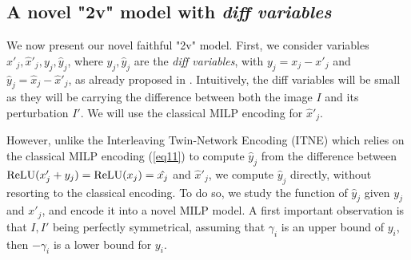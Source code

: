 	

 


	\subsection{A novel "2v" model with {\em diff variables}}

	We now present our novel faithful "2v" model.
    First, we consider variables $x'_j,\hat{x}'_j, y_j, \hat{y}_j$, where $y_j, \hat{y}_j$ are the {\em diff variables}, with     $y_j = x_j - x'_j$ and $\hat{y}_j= \hat{x}_j - \hat{x}'_j$, as already proposed in \cite{ITNE}. 	Intuitively, the diff variables will be small as they will be carrying the difference between both the image $I$ and its perturbation $I'$.
    We will use the classical MILP encoding for $\hat{x}'_j$.

    However, unlike the Interleaving Twin-Network Encoding (ITNE) \cite{ITNE} which relies on the classical MILP encoding (\ref{eq11}) \cite{MILP} to compute $\hat{y}_j$ from the difference between 
	$\mathrm{ReLU}(x'_j + y_j) = \mathrm{ReLU}(x_j) = \hat{x_j}$
	and $\hat{x}'_j$, we compute $\hat{y}_j$ directly, without resorting to the classical encoding. To do so, we study the function of 
    $\hat{y}_j$ given $y_j$ and $x'_j$, and encode it into a novel MILP model.
    A first important observation is that $I,I'$ being perfectly symmetrical,
    assuming that $\gamma_i$ is an upper bound of $y_i$, then $-\gamma_i$ is a lower bound for $y_i$.

	
	
